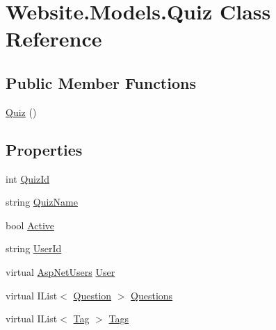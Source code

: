 \hypertarget{class_website_1_1_models_1_1_quiz}{}\section{Website.\+Models.\+Quiz Class Reference}
\label{class_website_1_1_models_1_1_quiz}
\subsection*{Public Member Functions}
\begin{DoxyCompactItemize}
\item 
\hyperlink{class_website_1_1_models_1_1_quiz_abcde9f7744fb43b91f292e9107ebb84f}{Quiz} ()
\end{DoxyCompactItemize}
\subsection*{Properties}
\begin{DoxyCompactItemize}
\item 
int \hyperlink{class_website_1_1_models_1_1_quiz_ad45c1ad69f371e83653007296a181ba9}{Quiz\+Id}
\item 
string \hyperlink{class_website_1_1_models_1_1_quiz_a4ba28e5b4ca29b9e78105fe40c1d721d}{Quiz\+Name}
\item 
bool \hyperlink{class_website_1_1_models_1_1_quiz_af0cf2c8588391591872bcffcd22b2353}{Active}
\item 
string \hyperlink{class_website_1_1_models_1_1_quiz_a97afd124e788d2496e83c8a5c9ccb51f}{User\+Id}
\item 
virtual \hyperlink{class_website_1_1_asp_net_users}{Asp\+Net\+Users} \hyperlink{class_website_1_1_models_1_1_quiz_ab9a38cf45b9b17c393670c6292e4b29f}{User}
\item 
virtual I\+List$<$ \hyperlink{class_website_1_1_models_1_1_question}{Question} $>$ \hyperlink{class_website_1_1_models_1_1_quiz_aa22a3b0df8db88169563c55a556df786}{Questions}
\item 
virtual I\+List$<$ \hyperlink{class_website_1_1_models_1_1_tag}{Tag} $>$ \hyperlink{class_website_1_1_models_1_1_quiz_a635b59e59e81a87e4b891ba6ffc8e07d}{Tags}
\end{DoxyCompactItemize}


